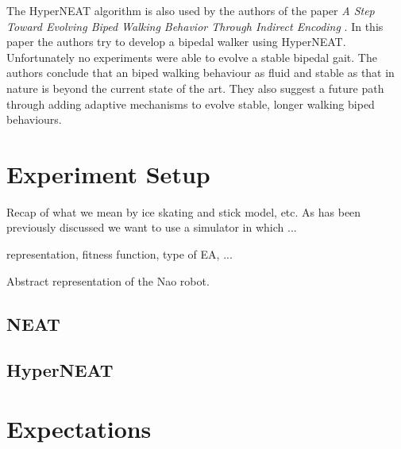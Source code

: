 \documentclass[10pt]{article}
\begin{document}
The HyperNEAT algorithm is also used by the authors of the paper \emph{A Step Toward Evolving Biped Walking Behavior Through Indirect Encoding} \cite{steptowardevolvingbipedwalkingbehavior}. In this paper the authors try to develop a bipedal walker using HyperNEAT. Unfortunately no experiments were able to evolve a stable bipedal gait. The authors conclude that an biped walking behaviour as fluid and stable as that in nature is beyond the current state of the art. They also suggest a future path through adding adaptive mechanisms to evolve stable, longer walking biped behaviours. 

\section{Experiment Setup}


Recap of what we mean by ice skating and stick model, etc.
As has been previously discussed we want to use a simulator in which ...

representation, fitness function,
type of EA, ...

Abstract representation of the Nao robot.

\subsection{NEAT}

\subsection{HyperNEAT}

\section{Expectations}



\end{document}

